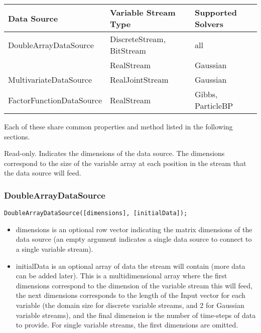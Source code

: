 \begin{longtable} {l | l | l}
Data Source & Variable Stream Type & Supported Solvers \\
\hline
\endhead
DoubleArrayDataSource & DiscreteStream, BitStream & all \\
 & RealStream & Gaussian \\
MultivariateDataSource & RealJointStream & Gaussian \\
FactorFunctionDataSource & RealStream & Gibbs, ParticleBP \\
\end{longtable} 

Each of these share common properties and method listed in the following sections.


\ifmatlab
{}

Read-only.  Indicates the dimensions of the data source.  The dimensions correspond to the size of the variable array at each position in the stream that the data source will feed.
\fi

\subsubsection{DoubleArrayDataSource}


\ifmatlab
\begin{lstlisting}
DoubleArrayDataSource([dimensions], [initialData]);
\end{lstlisting}

\begin{itemize}
\item dimensions is an optional row vector indicating the matrix dimensions of the data source (an empty argument indicates a single data source to connect to a single variable stream).
\item initialData is an optional array of data the stream will contain (more data can be added later).  This is a multidimensional array where the first dimensions correspond to the dimension of the variable stream this will feed, the next dimensions corresponds to the length of the Input vector for each variable (the domain size for discrete variable streams, and 2 for Gaussian variable streams), and the final dimension is the number of time-steps of data to provide.  For single variable streams, the first dimensions are omitted.
\end{itemize}
\fi

